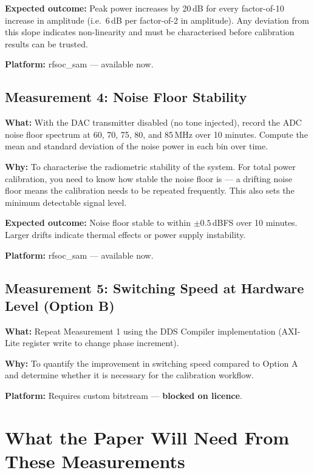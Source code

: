 \documentclass[11pt,a4paper]{article}
\begin{document}
\textbf{Expected outcome:} Peak power increases by 20\,dB for every factor-of-10
increase in amplitude (i.e.\ 6\,dB per factor-of-2 in amplitude). Any deviation
from this slope indicates non-linearity and must be characterised before calibration
results can be trusted.

\textbf{Platform:} rfsoc\_sam --- available now.

\subsection{Measurement 4: Noise Floor Stability}
\label{sec:m4}

\textbf{What:} With the DAC transmitter disabled (no tone injected), record the
ADC noise floor spectrum at 60, 70, 75, 80, and 85\,MHz over 10 minutes. Compute
the mean and standard deviation of the noise power in each bin over time.

\textbf{Why:} To characterise the radiometric stability of the system. For total
power calibration, you need to know how stable the noise floor is --- a drifting
noise floor means the calibration needs to be repeated frequently. This also sets
the minimum detectable signal level.

\textbf{Expected outcome:} Noise floor stable to within $\pm 0.5$\,dBFS over
10 minutes. Larger drifts indicate thermal effects or power supply instability.

\textbf{Platform:} rfsoc\_sam --- available now.

\subsection{Measurement 5: Switching Speed at Hardware Level (Option B)}
\label{sec:m5}

\textbf{What:} Repeat Measurement 1 using the DDS Compiler implementation
(AXI-Lite register write to change phase increment).

\textbf{Why:} To quantify the improvement in switching speed compared to Option A
and determine whether it is necessary for the calibration workflow.

\textbf{Platform:} Requires custom bitstream --- \textbf{blocked on licence}.

\section{What the Paper Will Need From These Measurements}
\end{document}
